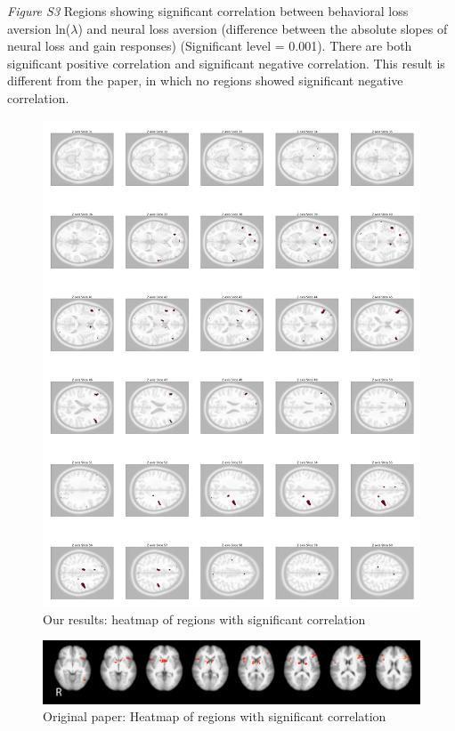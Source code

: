 \documentclass[11pt]{article}
\begin{document}
\newpage

\emph{Figure S3} Regions showing significant correlation between behavioral 
loss aversion ln($\lambda$) and neural loss aversion (difference between the 
absolute slopes of neural loss and gain responses) (Significant level = 0.001). 
There are both significant positive correlation and significant negative 
correlation. This result is different from the paper, in which no regions 
showed significant negative correlation.

\begin{figure}[H]
\centering
\includegraphics[scale=0.105]{figures/Regression3/sig_cor_z_neural_aversion.png}
\caption{Our results: heatmap of regions with significant correlation}
\end{figure}

\begin{figure}[H]
\centering
\includegraphics[scale=0.5]{figures/Regression3/Orig_sig_cor_z_neural_aversion.png}
\caption{Original paper: Heatmap of regions with significant correlation}
\end{figure}
\end{document}
